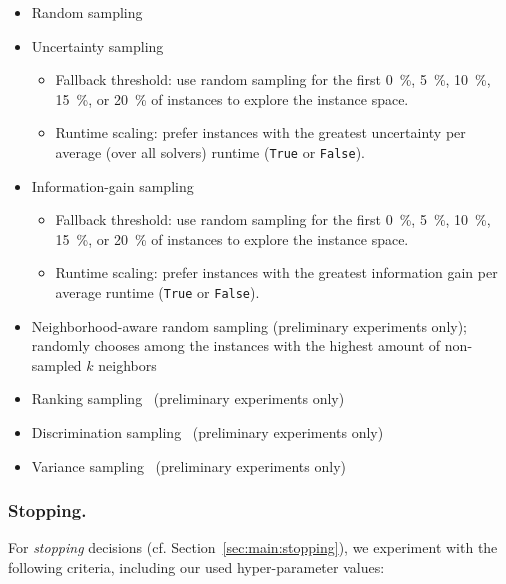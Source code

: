 \documentclass[runningheads]{llncs}
\begin{document}
\begin{itemize}
  \item Random sampling 
  \item Uncertainty sampling
  \begin{itemize}
    \item Fallback threshold: use random sampling for the first \SI{0}{\%}, \SI{5}{\%}, \SI{10}{\%}, \SI{15}{\%}, or \SI{20}{\%} of instances to explore the instance space.
    \item Runtime scaling: prefer instances with the greatest uncertainty per average (over all solvers) runtime (\texttt{True} or \texttt{False}).
  \end{itemize}

  \item Information-gain sampling
  \begin{itemize}
    \item Fallback threshold: use random sampling for the first \SI{0}{\%}, \SI{5}{\%}, \SI{10}{\%}, \SI{15}{\%}, or \SI{20}{\%} of instances to explore the instance space.
    \item Runtime scaling: prefer instances with the greatest information gain per average runtime (\texttt{True} or \texttt{False}).
  \end{itemize}

  \item Neighborhood-aware random sampling (preliminary experiments only); randomly chooses among the instances with the highest amount of non-sampled $k$ neighbors
  \item Ranking sampling~\cite{Bossek021a} (preliminary experiments only)
  \item Discrimination sampling~\cite{GentHJKMNN14} (preliminary experiments only)
  \item Variance sampling~\cite{MatriconAFSH21} (preliminary experiments only)
\end{itemize}

\subsubsection{Stopping.}

For \emph{stopping} decisions (cf. Section~\ref{sec:main:stopping}), we experiment with the following criteria, including our used hyper-parameter values:
\end{document}
